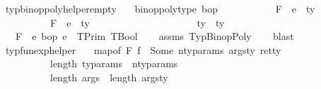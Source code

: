 \begin{isabellebody}
\isanewline
{}\isamarkupfalse%
\ typ{\isacharunderscore}{\kern0pt}binop{\isacharunderscore}{\kern0pt}poly{\isacharunderscore}{\kern0pt}helper{\isacharunderscore}{\kern0pt}empty{\isacharcolon}{\kern0pt}\isanewline
\ \ \ {\isachardoublequoteopen}binop{\isacharunderscore}{\kern0pt}poly{\isacharunderscore}{\kern0pt}type\ bop{\isachardoublequoteclose}\ \isanewline
\ \ \ \ \ \ \ \ \ \ {\isachardoublequoteopen}F{\isacharcomma}{\kern0pt}{\isasymDelta}\ {\isasymturnstile}\ e{}\ {\isacharcolon}{\kern0pt}\ ty{}{\isachardoublequoteclose}\ \isanewline
\ \ \ \ \ \ \ \ \ \ {\isachardoublequoteopen}F{\isacharcomma}{\kern0pt}{\isasymDelta}\ {\isasymturnstile}\ e{}\ {\isacharcolon}{\kern0pt}\ ty{}{\isachardoublequoteclose}\ \ \ \ \ \ \ \ \ \ \ \isanewline
\ \ \ \ \ \ \ \ \ \ {\isachardoublequoteopen}ty{}\ {\isacharequal}{\kern0pt}\ ty{}{\isachardoublequoteclose}\isanewline
\ \ \ {\isachardoublequoteopen}F{\isacharcomma}{\kern0pt}{\isasymDelta}\ {\isasymturnstile}\ e{}\ {\isasymguillemotleft}bop{\isasymguillemotright}\ e{}\ {\isacharcolon}{\kern0pt}\ TPrim\ {\isacharparenleft}{\kern0pt}TBool{\isacharparenright}{\kern0pt}{\isachardoublequoteclose}\isanewline
%
\isadelimproof
\ \ %
\endisadelimproof
%
\isatagproof
{}\isamarkupfalse%
\ assms\ TypBinopPoly\isanewline
\ \ \isamarkupfalse%
\ blast%
\endisatagproof
{\isafoldproof}%
%
\isadelimproof
\isanewline
%
\endisadelimproof
\isanewline
{}\isamarkupfalse%
\ typ{\isacharunderscore}{\kern0pt}funexp{\isacharunderscore}{\kern0pt}helper{\isacharcolon}{\kern0pt}\isanewline
\ \ \ {\isachardoublequoteopen}map{\isacharunderscore}{\kern0pt}of\ F\ f\ {\isacharequal}{\kern0pt}\ Some\ {\isacharparenleft}{\kern0pt}n{\isacharunderscore}{\kern0pt}ty{\isacharunderscore}{\kern0pt}params{\isacharcomma}{\kern0pt}\ args{\isacharunderscore}{\kern0pt}ty{\isacharcomma}{\kern0pt}\ ret{\isacharunderscore}{\kern0pt}ty{\isacharparenright}{\kern0pt}{\isachardoublequoteclose}\ \isanewline
\ \ \ \ \ \ \ \ \ \ {\isachardoublequoteopen}length\ ty{\isacharunderscore}{\kern0pt}params\ {\isacharequal}{\kern0pt}\ n{\isacharunderscore}{\kern0pt}ty{\isacharunderscore}{\kern0pt}params{\isachardoublequoteclose}\ \isanewline
\ \ \ \ \ \ \ \ \ \ {\isachardoublequoteopen}length\ args\ {\isacharequal}{\kern0pt}\ length\ args{\isacharunderscore}{\kern0pt}ty{\isachardoublequoteclose}\ \isanewline

\end{isabellebody}
